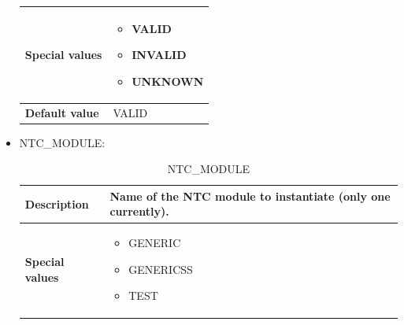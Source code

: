 \documentclass{template/openetcs}
\begin{document}
\begin{itemize}
\begin{longtable}{|l|l|}
					\begin{minipage}[t]{0.22\linewidth} \textbf{Special values}	\end{minipage} 
				&	\begin{minipage}[t]{0.78\linewidth} \begin{itemize} \item VALID \item INVALID \item UNKNOWN \end{itemize} \end{minipage} \\
				
				\hline
				
					\begin{minipage}[t]{0.22\linewidth} \textbf{Default value}	\end{minipage} 
				&	\begin{minipage}[t]{0.78\linewidth} VALID \end{minipage} \\
				
				\hline
				
			\end{longtable}
			
		\item NTC\_MODULE:
																			
			\begin{longtable}{|l|l|}
				\caption{NTC\_MODULE}\\ 
				\hline
				
					\begin{minipage}[t]{0.22\linewidth} \textbf{Description} \end{minipage} 
				&	\begin{minipage}[t]{0.78\linewidth} Name of the NTC module to instantiate (only one currently). \end{minipage} \\
				
				\hline
																																									
					\begin{minipage}[t]{0.22\linewidth} \textbf{Special values}	\end{minipage} 
				&	\begin{minipage}[t]{0.78\linewidth} \begin{itemize} \item GENERIC \item GENERICSS \item TEST \end{itemize} \end{minipage} \\
				

\end{longtable}
\end{itemize}
\end{document}
